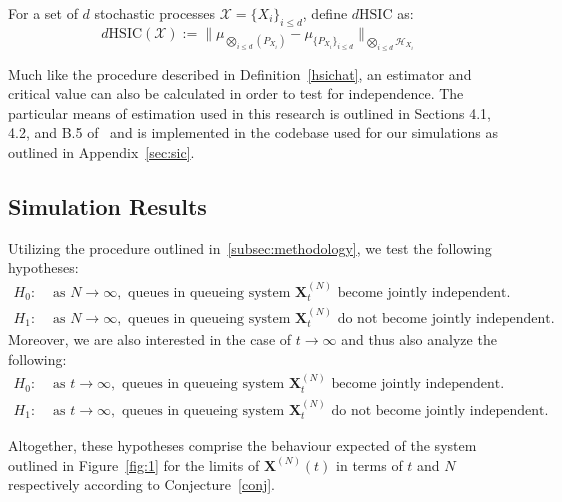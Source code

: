 \begin{definition}[$d$HSIC]

    \label{dhsic}
    For a set of $d$ stochastic processes $\mathcal{X} = \{X_{i}\}_{i \leq d}$, define $d\text{HSIC}$ as:
    \[d\text{HSIC}(\mathcal{X}) := \|\mu_{\bigotimes_{i \leq d}(P_{X_{i}})} - \mu_{\{P_{X_{i}}\}_{i \leq d}}\|_{\bigotimes_{i \leq d}\mathcal{H}_{X_{i}}}\]
\end{definition}

Much like the procedure described in Definition~\ref{hsichat}, an estimator and critical value can also be calculated in order to test for independence.
The particular means of estimation used in this research is outlined in Sections 4.1, 4.2, and B.5 of~\cite{jointindep} and is
implemented in the codebase used for our simulations as outlined in Appendix~\ref{sec:sic}.

\subsection{Simulation Results}\label{subsec:simulation-results}
Utilizing the procedure outlined in~\ref{subsec:methodology}, we test the following hypotheses:
\begin{align*}
    \label{set 2}
    H_{0}:& \text{ as } N\rightarrow \infty, \text{ queues in queueing system } \mathbf{X}_{t}^{(N)} \text{ become jointly independent.}  \\
    H_{1}:& \text{ as } N\rightarrow \infty, \text{ queues in queueing system } \mathbf{X}_{t}^{(N)} \text{ do not become jointly independent.}
\end{align*}
Moreover, we are also interested in the case of $t \rightarrow \infty$ and thus also analyze the following:
\begin{align*}
    \label{set 1}
    H_{0}:& \text{ as } t\rightarrow \infty, \text{ queues in queueing system } \mathbf{X}_{t}^{(N)} \text{ become jointly independent.}  \\
    H_{1}:& \text{ as } t\rightarrow \infty, \text{ queues in queueing system } \mathbf{X}_{t}^{(N)} \text{ do not become jointly independent.}
\end{align*}

Altogether, these hypotheses comprise the behaviour expected of the system outlined in Figure~\ref{fig:1} for the limits of $\mathbf{X}^{(N)}(t)$
in terms of $t$ and $N$ respectively according to Conjecture~\ref{conj}.

